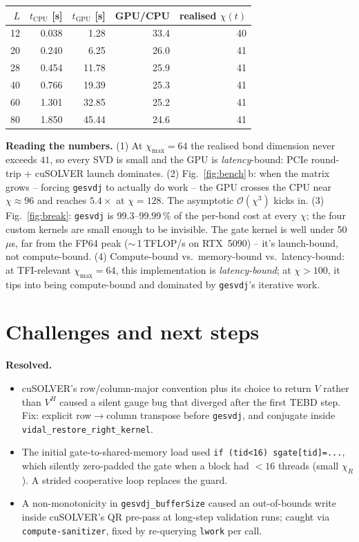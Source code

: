 \documentclass[11pt]{article}
\begin{document}
\begin{center}\small
\begin{tabular}{@{}rrrrr@{}}
\toprule
$L$ & $t_\text{CPU}$ [s] & $t_\text{GPU}$ [s] & GPU/CPU & realised $\chi(t)$ \\
\midrule
12 & 0.038 & 1.28 & 33.4 & 40 \\
20 & 0.240 & 6.25 & 26.0 & 41 \\
28 & 0.454 & 11.78 & 25.9 & 41 \\
40 & 0.766 & 19.39 & 25.3 & 41 \\
60 & 1.301 & 32.85 & 25.2 & 41 \\
80 & 1.850 & 45.44 & 24.6 & 41 \\
\bottomrule
\end{tabular}
\end{center}

\textbf{Reading the numbers.} (1) At $\chi_\text{max}{=}64$ the realised
bond dimension never exceeds $41$, so every SVD is small and the GPU is
\emph{latency}-bound: PCIe round-trip + cuSOLVER launch dominates.
(2) Fig.~\ref{fig:bench}\,b: when the matrix grows -- forcing
\texttt{gesvdj} to actually do work -- the GPU crosses the CPU near
$\chi{\approx}96$ and reaches $5.4\times$ at $\chi{=}128$. The
asymptotic $\mathcal{O}(\chi^3)$ kicks in. (3) Fig.~\ref{fig:break}:
\texttt{gesvdj} is 99.3--99.99\,\% of the per-bond cost at every
$\chi$; the four custom kernels are small enough to be invisible. The
gate kernel is well under 50\,$\mu$s, far from the FP64 peak
($\sim$\,1\,TFLOP/s on RTX~5090) -- it's launch-bound, not compute-bound.
(4) Compute-bound vs.\ memory-bound vs.\ latency-bound: at TFI-relevant
$\chi_\text{max}{=}64$, this implementation is \emph{latency-bound};
at $\chi{>}100$, it tips into being compute-bound and dominated by
\texttt{gesvdj}'s iterative work.

\section{Challenges and next steps}\label{sec:challenges}
\textbf{Resolved.}
\begin{itemize}
  \item cuSOLVER's row/column-major convention plus its choice to
  return $V$ rather than $V^{H}$ caused a silent gauge bug that
  diverged after the first TEBD step. Fix: explicit row$\to$column
  transpose before \texttt{gesvdj}, and conjugate inside
  \texttt{vidal\_restore\_right\_kernel}.
  \item The initial gate-to-shared-memory load used
  \texttt{if (tid<16) sgate[tid]=...}, which silently zero-padded the
  gate when a block had $<\!16$ threads (small $\chi_R$). A strided
  cooperative loop replaces the guard.
  \item A non-monotonicity in \texttt{gesvdj\_bufferSize} caused an
  out-of-bounds write inside cuSOLVER's QR pre-pass at long-step
  validation runs; caught via \texttt{compute-sanitizer}, fixed by
  re-querying \texttt{lwork} per call.
\end{itemize}
\end{document}
